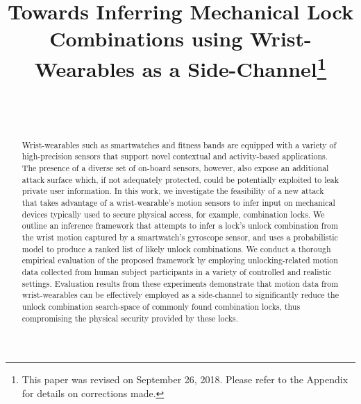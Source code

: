 \documentclass[]{IEEEtran}
\begin{document}

\title{Towards Inferring Mechanical Lock Combinations using Wrist-Wearables as a Side-Channel\thanks{This paper was revised on September 26, 2018. Please refer to the Appendix for details on corrections made.}}

\author{
\\
 \\

}


\maketitle

\begin{abstract}
Wrist-wearables such as smartwatches and fitness bands are equipped with a variety of high-precision sensors that support novel contextual and activity-based applications. The presence of a diverse set of on-board sensors, however, also expose an additional attack surface which, if not adequately protected, could be potentially exploited to leak private user information. In this work, we investigate the feasibility of a new attack that takes advantage of a wrist-wearable's motion sensors to infer input on mechanical devices typically used to secure physical access, for example, combination locks. We outline an inference framework that attempts to infer a lock's unlock combination from the wrist motion captured by a smartwatch's gyroscope sensor, and uses a probabilistic model to produce a ranked list of likely unlock combinations. We conduct a thorough empirical evaluation of the proposed framework by employing unlocking-related motion data collected from human subject participants in a variety of controlled and realistic settings. Evaluation results from these experiments demonstrate that motion data from wrist-wearables can be effectively employed as a side-channel to significantly reduce the unlock combination search-space of commonly found combination locks, thus compromising the physical security provided by these locks.
\end{abstract}
\end{document}
